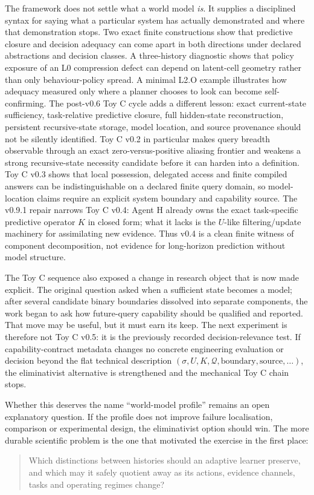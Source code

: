 \documentclass[10pt]{article}
\begin{document}
The framework does not settle what a world model \emph{is}. It supplies a disciplined syntax for saying what a particular system has actually demonstrated and where that demonstration stops. Two exact finite constructions show that predictive closure and decision adequacy can come apart in both directions under declared abstractions and decision classes. A three-history diagnostic shows that policy exposure of an L0 compression defect can depend on latent-cell geometry rather than only behaviour-policy spread. A minimal L2.O example illustrates how adequacy measured only where a planner chooses to look can become self-confirming. The post-v0.6 Toy C cycle adds a different lesson: exact current-state sufficiency, task-relative predictive closure, full hidden-state reconstruction, persistent recursive-state storage, model location, and source provenance should not be silently identified. Toy C v0.2 in particular makes query breadth observable through an exact zero-versus-positive aliasing frontier and weakens a strong recursive-state necessity candidate before it can harden into a definition. Toy C v0.3 shows that local possession, delegated access and finite compiled answers can be indistinguishable on a declared finite query domain, so model-location claims require an explicit system boundary and capability source. The v0.9.1 repair narrows Toy C v0.4: Agent H already owns the exact task-specific predictive operator $K$ in closed form; what it lacks is the $U$-like filtering/update machinery for assimilating new evidence. Thus v0.4 is a clean finite witness of component decomposition, not evidence for long-horizon prediction without model structure.


The Toy C sequence also exposed a change in research object that is now made explicit. The original question asked when a sufficient state becomes a model; after several candidate binary boundaries dissolved into separate components, the work began to ask how future-query capability should be qualified and reported. That move may be useful, but it must earn its keep. The next experiment is therefore not Toy C v0.5: it is the previously recorded decision-relevance test. If capability-contract metadata changes no concrete engineering evaluation or decision beyond the flat technical description $(\sigma,U,K,\mathcal Q,\text{boundary},\text{source},\ldots)$, the eliminativist alternative is strengthened and the mechanical Toy C chain stops.

Whether this deserves the name ``world-model profile'' remains an open explanatory question. If the profile does not improve failure localisation, comparison or experimental design, the eliminativist option should win. The more durable scientific problem is the one that motivated the exercise in the first place:
\begin{quote}
Which distinctions between histories should an adaptive learner preserve, and which may it safely quotient away as its actions, evidence channels, tasks and operating regimes change?
\end{quote}
\end{document}
